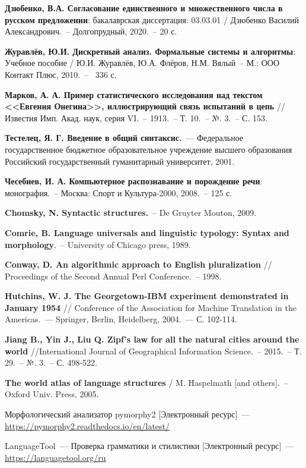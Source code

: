 \documentclass[oneside, final, 12pt]{article}
\theoremstyle{plain}
\theoremstyle{plain} %
\begin{document}

\begin{thebibliography}{500}
	

\textbf{ Дзюбенко, В.А. Согласование единственного и множественного числа в русском предложении}: бакалаврская диссертация: 03.03.01 / Дзюбенко Василий Александрович.~-- Долгопрудный, 2020.~-- 20 с.

\textbf{ Журавлёв, Ю.И. Дискретный анализ. Формальные системы и алгоритмы}: Учебное пособие / Ю.И. Журавлёв, Ю.А. Флёров, Н.М. Вялый~-- М.: ООО Контакт Плюс, 2010.~--~ 336 с.

 \textbf{Марков, А. А. Пример статистического исследования над текстом  <<Евгения Онегина>>, иллюстрирующий связь испытаний в цепь} // Известия Имп. Акад. наук, серия VI.~-- 1913.~-- Т. 10.~-- №. 3.~-- С. 153.

 \textbf{Тестелец, Я. Г. Введение в общий синтаксис.}~--- Федеральное государственное бюджетное образовательное учреждение высшего образования Российский государственный гуманитарный университет, 2001.


 \textbf{Чесебиев, И. А. Компьютерное распознавание и порождение речи}: монография.~-- Москва: Спорт и Культура-2000, 2008.~-- 125 с.

 \textbf{Chomsky, N. Syntactic structures.}~-- De Gruyter Mouton, 2009.

 \textbf{Comrie, B. Language universals and linguistic typology: Syntax and morphology}.~-- University of Chicago press, 1989.

 \textbf{Conway, D. An algorithmic approach to English pluralization} // Proceedings of the Second Annual Perl Conference.~-- 1998.

 \textbf{Hutchins, W. J. The Georgetown-IBM experiment demonstrated in January 1954} // Conference of the Association for Machine Translation in the Americas.~--- Springer, Berlin, Heidelberg, 2004.~--- С. 102-114.

 \textbf{Jiang B., Yin J., Liu Q. Zipf’s law for all the natural cities around the world }//International Journal of Geographical Information Science.~-- 2015.~-- Т. 29.~-- №. 3.~-- С. 498-522.

 \textbf{The world atlas of language structures} / M. Haspelmath [and others].~-- Oxford Univ. Press, 2005.

 Морфологический анализатор pymorphy2 [Электронный ресурс]~--- \href{https://pymorphy2.readthedocs.io/en/latest/}{https://pymorphy2.readthedocs.io/en/latest/}

 LanguageTool~--- Проверка грамматики и стилистики [Электронный ресурс]~--- \href{https://languagetool.org/ru}{https://languagetool.org/ru}


\end{thebibliography}
\pagebreak

\appendix


\pagebreak

\end{document}
